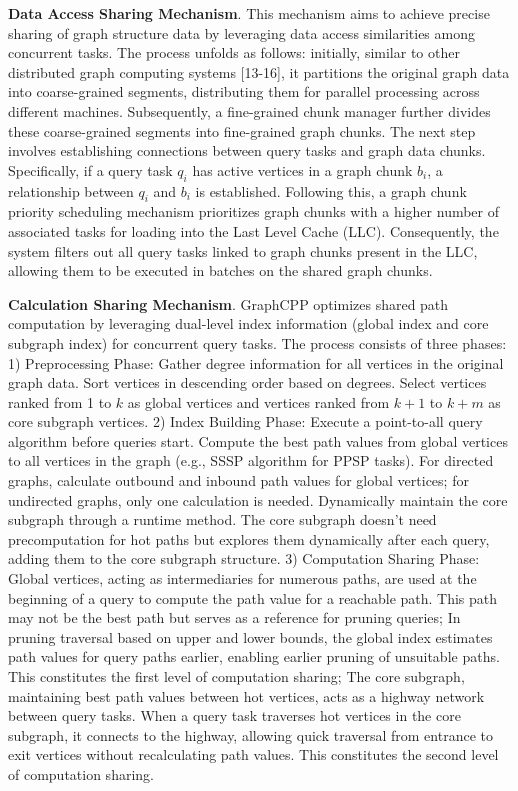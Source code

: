 \documentclass[lettersize,journal]{IEEEtran} %
\begin{document}
{\bf{Data Access Sharing Mechanism}}. This mechanism aims to achieve precise sharing of graph structure data by leveraging data access similarities among concurrent tasks. The process unfolds as follows: initially, similar to other distributed graph computing systems [13-16], it partitions the original graph data into coarse-grained segments, distributing them for parallel processing across different machines. Subsequently, a fine-grained chunk manager further divides these coarse-grained segments into fine-grained graph chunks. The next step involves establishing connections between query tasks and graph data chunks. Specifically, if a query task $q_i$ has active vertices in a graph chunk $b_i$, a relationship between $q_i$ and $b_i$ is established. Following this, a graph chunk priority scheduling mechanism prioritizes graph chunks with a higher number of associated tasks for loading into the Last Level Cache (LLC). Consequently, the system filters out all query tasks linked to graph chunks present in the LLC, allowing them to be executed in batches on the shared graph chunks.

{\bf{Calculation Sharing Mechanism}}. GraphCPP optimizes shared path computation by leveraging dual-level index information (global index and core subgraph index) for concurrent query tasks. The process consists of three phases: 1) Preprocessing Phase: Gather degree information for all vertices in the original graph data. Sort vertices in descending order based on degrees. Select vertices ranked from 1 to $k$ as global vertices and vertices ranked from $k+1$ to $k+m$ as core subgraph vertices. 2) Index Building Phase: Execute a point-to-all query algorithm before queries start. Compute the best path values from global vertices to all vertices in the graph (e.g., SSSP algorithm for PPSP tasks). For directed graphs, calculate outbound and inbound path values for global vertices; for undirected graphs, only one calculation is needed. Dynamically maintain the core subgraph through a runtime method. The core subgraph doesn't need precomputation for hot paths but explores them dynamically after each query, adding them to the core subgraph structure. 3) Computation Sharing Phase: Global vertices, acting as intermediaries for numerous paths, are used at the beginning of a query to compute the path value for a reachable path. This path may not be the best path but serves as a reference for pruning queries; In pruning traversal based on upper and lower bounds, the global index estimates path values for query paths earlier, enabling earlier pruning of unsuitable paths. This constitutes the first level of computation sharing; The core subgraph, maintaining best path values between hot vertices, acts as a highway network between query tasks. When a query task traverses hot vertices in the core subgraph, it connects to the highway, allowing quick traversal from entrance to exit vertices without recalculating path values. This constitutes the second level of computation sharing.
\end{document}
